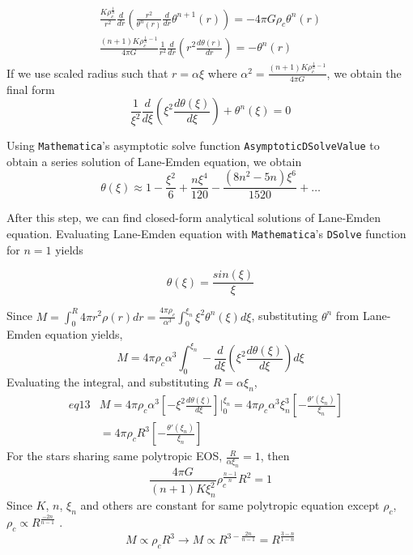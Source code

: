 \documentclass[aps,twocolumn,showpacs,preprintnumbers,nofootinbib,prl,superscriptaddress,groupedaddress]{revtex4-2}
\begin{document}
\begin{align}
	\frac{K\rho_c^{\frac{1}{n}}}{r^2}\frac{d}{dr}(\frac{r^2}{\theta^n(r)}\frac{d}{dr}\theta^{n+1}(r)) = -4\pi G  \rho_c\theta^n(r) \\
	\frac{(n+1)K\rho_c^{\frac{1}{n}-1}}{4\pi G  }\frac{1}{r^2}\frac{d}{dr}(r^2\frac{d\theta(r)}{dr}) = -\theta^n(r)
\end{align}
If we use scaled radius such that $r = \alpha \xi$  where $\alpha^2 = \frac{(n+1)K\rho_c^{\frac{1}{n}-1}}{4\pi G  }$, we obtain the final form
\begin{equation}
	\frac{1}{\xi^2}\frac{d}{d\xi}(\xi^2\frac{d\theta(\xi)}{d\xi}) + \theta^n(\xi) = 0
\end{equation}

Using \texttt{Mathematica}'s asymptotic solve function \texttt{AsymptoticDSolveValue} to obtain a series solution of Lane-Emden equation, we obtain
\begin{equation}
\theta(\xi) \approx 1 - \frac{\xi^2}{6}+\frac{n\xi^4}{120}-\frac{(8n^2-5n)\xi^6}{1520}+\dots
\end{equation}

After this step, we can find closed-form analytical solutions of Lane-Emden equation. Evaluating Lane-Emden equation with \texttt{Mathematica}'s \texttt{DSolve} function for $n=1$ yields

\begin{equation}
	\theta(\xi) = \frac{sin(\xi)}{\xi}
\end{equation}


Since $M = \int_0^R 4\pi r^2\rho(r)dr = \frac{4\pi \rho_c}{\alpha^3}\int_0^{\xi_n} \xi^2\theta^n(\xi)d\xi$, substituting $\theta^n$ from Lane-Emden equation yields,
\begin{equation}
	M = 4\pi \rho_c\alpha^3\int_0^{\xi_n} -\frac{d}{d\xi}(\xi^2\frac{d\theta(\xi)}{d\xi})d\xi
\end{equation}
Evaluating the integral, and substituting $R = \alpha\xi_n$,
\begin{align}\label{eq12}{eq13}
&	M = 4\pi \rho_c\alpha^3[-\xi^2\frac{d\theta(\xi)}{d\xi}]\bigg|_0^{\xi_n} = 4\pi \rho_c\alpha^3\xi^3_n[-\frac{\theta'(\xi_n)}{\xi_n}] & \\
	&= 4\pi \rho_cR^3[-\frac{\theta'(\xi_n)}{\xi_n}] & 
\end{align}
For the stars sharing same polytropic EOS, $\frac{R}{\alpha\xi_n}=1$, then
\begin{equation}
	\frac{4\pi G}{(n+1)K \xi_n^2}\rho_c^{\frac{n-1}{n}}R^2 =1
\end{equation}
Since $K$, $n$, $\xi_n$ and others are constant for same polytropic equation except $\rho_c$, $\rho_c \propto R^{\frac{-2n}{n-1}}$ . \\
\begin{equation}
	M \propto \rho_cR^3 \to M \propto R^{3-\frac{2n}{n-1}}=R^{\frac{3-n}{1-n}}
\end{equation}
\end{document}
